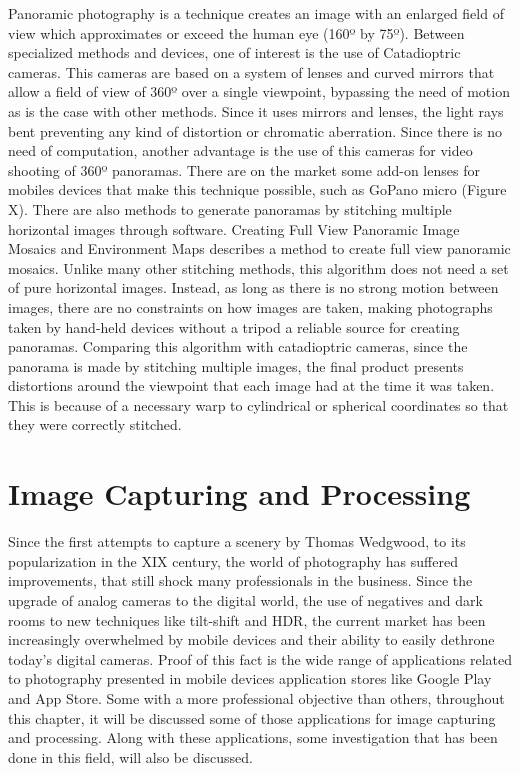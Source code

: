  Panoramic photography is a technique creates an image with an enlarged field of view which approximates or exceed the human eye (160º by 75º). Between specialized methods and devices, one of interest is the use of Catadioptric cameras. This cameras are based on a system of lenses and curved mirrors that allow a field of view of 360º over a single viewpoint, bypassing the need of motion as is the case with other methods. Since it uses mirrors and lenses, the light rays bent preventing any kind of distortion or chromatic aberration. Since there is no need of computation, another advantage is the use of this cameras for video shooting of 360º panoramas. 
There are on the market some add-on lenses for mobiles devices that make this technique possible, such as GoPano micro (Figure X).
There are also methods to generate panoramas by stitching multiple horizontal images through software. Creating Full View Panoramic Image Mosaics and Environment Maps describes a method to create full view panoramic mosaics. Unlike many other stitching methods, this algorithm does not need a set of pure horizontal images. Instead, as long as there is no strong motion between images, there are no constraints on how images are taken, making photographs taken by hand-held devices without a tripod a reliable source for creating panoramas.
Comparing this algorithm with catadioptric cameras, since the panorama is made by stitching multiple images, the final product presents distortions around the viewpoint that each image had at the time it was taken. This is because of a necessary warp to cylindrical or spherical coordinates so that they were correctly stitched.

\section{Image Capturing and Processing}
\label{sub:capturing_processing}

 Since the first attempts to capture a scenery by Thomas Wedgwood, to its popularization in the XIX century, the world of photography has suffered improvements, that still shock many professionals in the business. Since the upgrade of analog cameras to the digital world, the use of negatives and dark rooms to new techniques like tilt-shift and HDR, the current market has been increasingly overwhelmed by mobile devices and their ability to easily dethrone today’s digital cameras. Proof of this fact is the wide range of applications related to photography presented in mobile devices application stores like Google Play and App Store. Some with a more professional objective than others, throughout this chapter, it will be discussed some of those applications for image capturing and processing. Along with these applications, some investigation that has been done in this field, will also be discussed.

